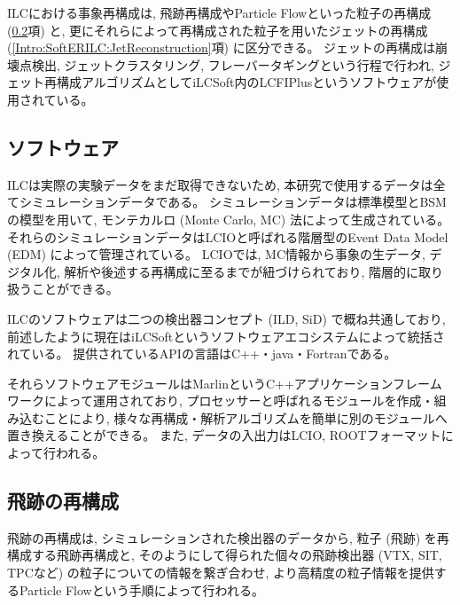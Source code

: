 ILCにおける事象再構成は, 飛跡再構成やParticle Flowといった粒子の再構成 (\ref{Intro:SoftERILC:ParticleReconstruction}項) と, 更にそれらによって再構成された粒子を用いたジェットの再構成 (\ref{Intro:SoftERILC:JetReconstruction}項) に区分できる。
ジェットの再構成は崩壊点検出, ジェットクラスタリング, フレーバータギングという行程で行われ, ジェット再構成アルゴリズムとしてiLCSoft内のLCFIPlus\cite{LCFIPlus}というソフトウェアが使用されている。


\subsection{ソフトウェア} \label{Intro:SoftERILC:Software}

ILCは実際の実験データをまだ取得できないため, 本研究で使用するデータは全てシミュレーションデータである。
シミュレーションデータは標準模型とBSMの模型を用いて, モンテカルロ (Monte Carlo, MC) 法によって生成されている。
それらのシミュレーションデータはLCIOと呼ばれる階層型のEvent Data Model (EDM) によって管理されている。
LCIOでは, MC情報から事象の生データ, デジタル化, 解析や後述する再構成に至るまでが紐づけられており, 階層的に取り扱うことができる。

ILCのソフトウェアは二つの検出器コンセプト (ILD, SiD) で概ね共通しており, 前述したように現在はiLCSoftというソフトウェアエコシステムによって統括されている。
提供されているAPIの言語はC++・java・Fortranである。

それらソフトウェアモジュールはMarlin\cite{Marlinpaper}というC++アプリケーションフレームワークによって運用されており, プロセッサーと呼ばれるモジュールを作成・組み込むことにより, 様々な再構成・解析アルゴリズムを簡単に別のモジュールへ置き換えることができる。
また, データの入出力はLCIO, ROOTフォーマットによって行われる。

\newpage
\subsection{飛跡の再構成} \label{Intro:SoftERILC:ParticleReconstruction}

飛跡の再構成は, シミュレーションされた検出器のデータから, 粒子 (飛跡) を再構成する飛跡再構成と, そのようにして得られた個々の飛跡検出器 (VTX, SIT, TPCなど) の粒子についての情報を繋ぎ合わせ, より高精度の粒子情報を提供するParticle Flowという手順によって行われる。\\

